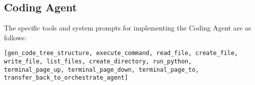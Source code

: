 \subsection{Coding Agent}
The specific tools and system prompts for implementing the Coding Agent are as follows:
\begin{lstlisting}[basicstyle=\ttfamily\footnotesize, frame=none, columns=fullflexible, breaklines=true, breakatwhitespace=ture, breakindent=0pt, language=Tools, caption={Tools of \textbf{Coding Agent}}, frame=shadowbox,xleftmargin=0.02\linewidth, xrightmargin=0.02\linewidth]
[gen_code_tree_structure, execute_command, read_file, create_file, write_file, list_files, create_directory, run_python, terminal_page_up, terminal_page_down, terminal_page_to, transfer_back_to_orchestrate_agent]
\end{lstlisting}


